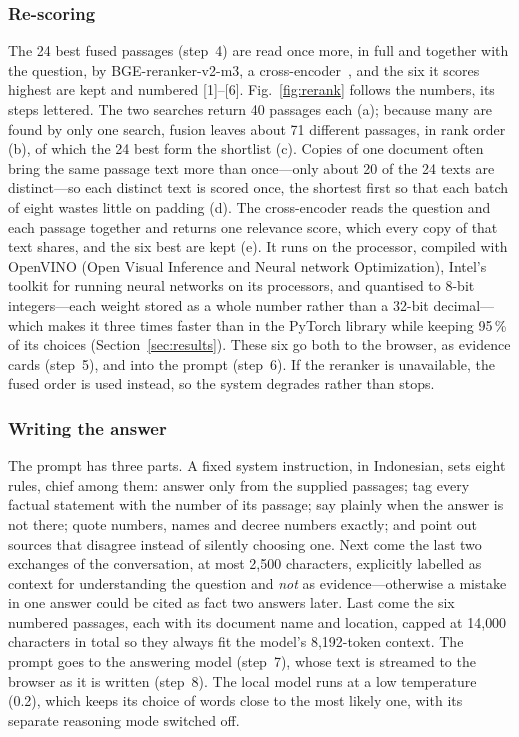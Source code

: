 \documentclass[conference]{IEEEtran}
\begin{document}
\subsubsection{Re-scoring}
The 24 best fused passages (step~4) are read once more, in full and together
with the question, by BGE-reranker-v2-m3, a cross-encoder~\cite{nogueira}, and
the six it scores highest are kept and numbered [1]--[6].
Fig.~\ref{fig:rerank} follows the numbers, its steps lettered. The two
searches return 40 passages each (a); because many are found by only one
search, fusion leaves about 71 different passages, in rank order (b), of which
the 24 best form the shortlist (c). Copies of one document often bring the
same passage text more than once---only about 20 of the 24 texts are
distinct---so each distinct text is scored once, the shortest first so that
each batch of eight wastes little on padding (d). The cross-encoder reads the
question and each passage together and returns one relevance score, which
every copy of that text shares, and the six best are kept (e). It runs on the
processor, compiled with OpenVINO (Open Visual Inference and Neural network
Optimization), Intel's toolkit for running neural networks on its processors,
and quantised to 8-bit integers---each weight stored as a whole number rather
than a 32-bit decimal---which makes it three times faster than in the PyTorch
library while keeping 95\,\% of its choices
(Section~\ref{sec:results}). These six go both to
the browser, as evidence cards (step~5), and into the prompt (step~6). If the
reranker is
unavailable, the fused order is used instead, so the system degrades rather
than stops.

\subsubsection{Writing the answer}
The prompt has three parts. A fixed system instruction, in Indonesian, sets
eight rules, chief among them: answer only from the supplied passages; tag every
factual statement with the number of its passage; say plainly when the answer
is not there; quote numbers, names and decree numbers exactly; and point out
sources that disagree instead of silently choosing one.
Next come the last two exchanges of the conversation, at most 2{,}500
characters, explicitly labelled as context for understanding the question and
\emph{not} as evidence---otherwise a mistake in one answer could be cited as
fact two answers later. Last come the six numbered passages, each with its
document name and location, capped at 14{,}000 characters in total so they
always fit the model's 8{,}192-token context. The prompt goes to the answering
model (step~7), whose text is streamed to the browser as it is written
(step~8). The local model runs at a low temperature (0.2), which keeps its
choice of words close to the most likely one, with its separate reasoning mode
switched off.
\end{document}
